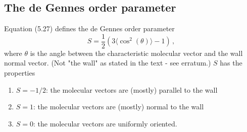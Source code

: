 \documentclass[11pt]{article}
\begin{document}
\subsection*{The de Gennes order parameter}
Equation (5.27) defines the de Gennes order parameter 
\begin{equation}
	\label{eq:degennes}
	S = \frac{1}{2}(3 \langle \cos^2(\theta)\rangle -1) \, ,
\end{equation}
where $\theta$ is the angle between the characteristic molecular vector and the wall normal vector. 
(Not "the wall" as stated in the text - see erratum.) $S$ has the properties
\begin{enumerate}
	\item $S=-1/2$: the molecular vectors are (mostly) parallel to the wall
	\item $S= 1$: the molecular vectors are (mostly) normal to the wall
	\item $S=0$: the molecular vectors are uniformly oriented. 
\end{enumerate}
\end{document}
